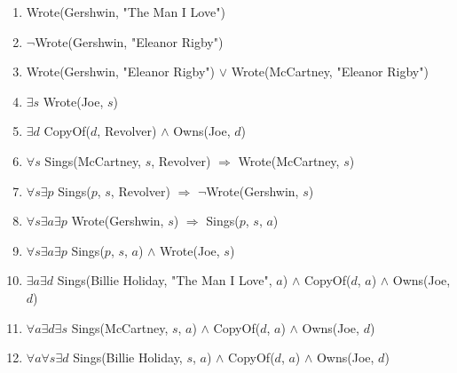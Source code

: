 \documentclass[11pt, answers]{exam}
\begin{document}
\begin{solution}
\begin{enumerate}[a]
\item
Wrote(Gershwin, "The Man I Love")
\item
$\neg$Wrote(Gershwin, "Eleanor Rigby")
\item
Wrote(Gershwin, "Eleanor Rigby") $\vee$ Wrote(McCartney, "Eleanor Rigby")
\item
$\exists s$ Wrote(Joe, $s$)
\item
$\exists d$ CopyOf($d$, Revolver) $\wedge$ Owns(Joe, $d$)
\item
$\forall s$ Sings(McCartney, $s$, Revolver) $\Rightarrow$ Wrote(McCartney, $s$)
\item
$\forall s\exists p$ Sings($p$, $s$, Revolver) $\Rightarrow$ $\neg$Wrote(Gershwin, $s$)
\item
$\forall s\exists a\exists p$ Wrote(Gershwin, $s$) $\Rightarrow$ Sings($p$, $s$, $a$)
\item
$\forall s\exists a\exists p$ Sings($p$, $s$, $a$) $\wedge$ Wrote(Joe, $s$)
\item
$\exists a\exists d$ Sings(Billie Holiday, "The Man I Love", $a$) $\wedge$ CopyOf($d$, $a$) $\wedge$ Owns(Joe, $d$)
\item
$\forall a\exists d\exists s$ Sings(McCartney, $s$, $a$) $\wedge$ CopyOf($d$, $a$) $\wedge$ Owns(Joe, $d$)
\item
$\forall a\forall s\exists d$ Sings(Billie Holiday, $s$, $a$) $\wedge$ CopyOf($d$, $a$) $\wedge$ Owns(Joe, $d$)
\end{enumerate}

\end{solution}
\end{document}
